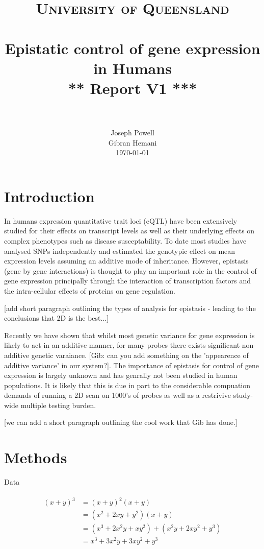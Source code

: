 \documentclass[paper=a4, fontsize=11pt]{scrartcl}	%
\title{
		\usefont{OT1}{bch}{b}{n}
		\normalfont \normalsize \textsc{University of Queensland} \\ [25pt]
		\horrule{0.5pt} \\[0.4cm]
		\huge Epistatic control of gene expression in Humans\\[0.3cm]
        \huge *** Report V1 *** \\
		\horrule{2pt} \\[0.5cm]
}
\author{
		\normalfont 								\normalsize
        Joseph Powell\\[-3pt]		\normalsize
        Gibran Hemani\\[0.2cm]		\normalsize
		\today
}
\date{}
\numberwithin{equation}{section}									%
\numberwithin{figure}{section}										%
\numberwithin{table}{section}										%
\begin{document}
\maketitle
\section{Introduction}
In humans expression quantitative trait loci (eQTL) have been extensively studied for their effects on transcript levels as well as their underlying effects on complex phenotypes such as disease susceptability. To date most studies have analysed SNPs independently and estimated the genotypic effect on mean expression levels assuming an additive mode of inheritance. However, epistasis (gene by gene interactions) is thought to play an important role in the control of gene expression principally through the interaction of transcription factors and the intra-cellular effects of proteins on gene regulation.

[add short paragraph outlining the types of analysis for epistasis - leading to the conclusions that 2D is the best...]

Recently we have shown that whilst most genetic variance for gene expression is likely to act in an additive manner, for many probes there exists significant non-additive genetic varaiance. [Gib: can you add something on the 'appearence of additive variance' in our system?]. The importance of epistasis for control of gene expression is largely unknown and has genrally not been studied in human populations. It is likely that this is due in part to the considerable compuation demands of running a 2D scan on 1000's of probes as well as a restrivive study-wide multiple testing burden.

[we can add a short paragraph outlining the cool work that Gib has done.]



\section{Methods}

Data


\cite{pmid22563384}



\begin{align} 
	\begin{split}
	(x+y)^3 	&= (x+y)^2(x+y)\\
					&=(x^2+2xy+y^2)(x+y)\\
					&=(x^3+2x^2y+xy^2) + (x^2y+2xy^2+y^3)\\
					&=x^3+3x^2y+3xy^2+y^3
	\end{split}					
\end{align}









\end{document}
